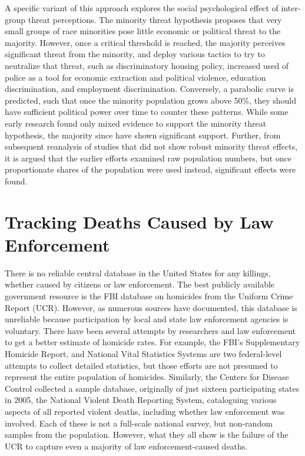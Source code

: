 \documentclass[sigconf]{acmart}
\begin{document}
A specific variant of this approach explores the social psychological effect of inter-group threat perceptions.  The minority threat hypothesis proposes that very small groups of race minorities pose little economic or political threat to the majority.  However, once a critical threshold is reached, the majority perceives significant threat from the minority, and deploy various tactics to try to neutralize that threat, such as discriminatory housing policy, increased used of police as a tool for economic extraction and political violence, education discrimination, and employment discrimination. \cite{luders10} Conversely, a parabolic curve is predicted, such that once the minority population grows above 50\%, they should have sufficient political power over time to counter these patterns. While some early research found only mixed evidence to support the minority threat hypothesis, the majority since have shown significant support. \cite{legewie15,smith04,smith14,holmes00,stults07,jacobs02,kent05,petro03}  Further, from subsequent reanalysis of studies that did not show robust minority threat effects, it is argued that the earlier efforts examined raw population numbers, but once proportionate shares of the population were used instead, significant effects were found. \cite{legewie15}

\section{Tracking Deaths Caused by Law Enforcement}
There is no reliable central database in the United States for any killings, whether caused by citizens or law enforcement.  The best publicly available government resource is the FBI database on homicides from the Uniform Crime Report (UCR).  However, as numerous sources have documented, this database is unreliable because participation by local and state law enforcement agencies is voluntary. \cite{currie16,pridemore05,dalton17} There have been several attempts by researchers and law enforcement to get a better estimate of homicide rates.  For example, the FBI's Supplementary Homicide Report, and National Vital Statistics Systems are two federal-level attempts to collect detailed statistics, but those efforts are not presumed to represent the entire population of homicides. \cite{pridemore05}  Similarly, the Centers for Disease Control collected a sample database, originally of just sixteen participating states in 2005, the National Violent Death Reporting System, cataloguing various aspects of all reported violent deaths, including whether law enforcement was involved. \cite{cdc13}  Each of these is not a full-scale national survey, but non-random samples from the population.  However, what they all show is the failure of the UCR to capture even a majority of law enforcement-caused deaths.
\end{document}
